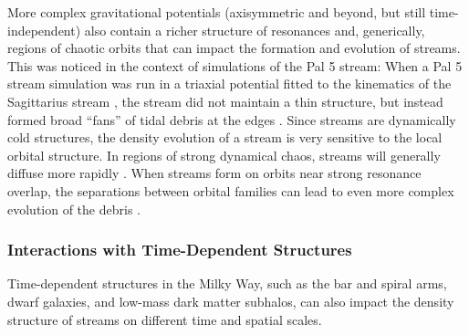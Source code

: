 \documentclass[final,5p,times,twocolumn,authoryear]{elsarticle}
\begin{document}
More complex gravitational potentials (axisymmetric and beyond, but still
time-independent) also contain a richer structure of resonances and, generically,
regions of chaotic orbits that can impact the formation and evolution of streams.
This was noticed in the context of simulations of the Pal 5 stream: When a Pal 5 stream
simulation was run in a triaxial potential fitted to the kinematics of the Sagittarius
stream \citep{law:2010}, the stream did not maintain a thin structure, but instead
formed broad ``fans'' of tidal debris at the edges \citep{pearson:2015}.
Since streams are dynamically cold structures, the density evolution of a stream is very
sensitive to the local orbital structure.
In regions of strong dynamical chaos, streams will generally diffuse more rapidly
\citep{price-whelan:2016a, mestre:2020}.
When streams form on orbits near strong resonance overlap, the separations between
orbital families can lead to even more complex evolution of the debris
\citep{yavetz:2021,yavetz:2023}.


\subsubsection{Interactions with Time-Dependent Structures}

Time-dependent structures in the Milky Way, such as the bar and spiral arms, dwarf
galaxies, and low-mass dark matter subhalos, can also impact the density structure of
streams on different time and spatial scales.
\end{document}
